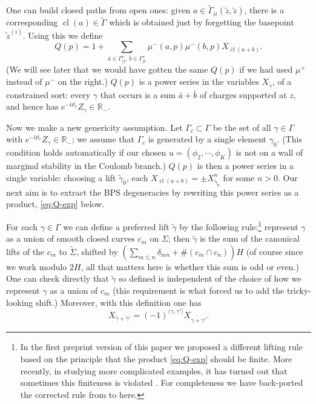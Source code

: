 \documentclass[11pt,a4paper]{article}
\def\R{{\mathbb{R}}}
\def\tz{{\tilde z}}
\newcommand\I{{\mathrm i}}
\newcommand{\inprod}[1]{\langle#1\rangle}
\DeclareMathOperator{\cl}{{cl}}
\begin{document}
One can build closed paths from open ones:  given $a \in \tilde \Gamma_{ii}(\tz,\tz)$,
there is a corresponding $\cl(a) \in \tilde \Gamma$ which is obtained just by forgetting the
basepoint $\tz^{(i)}$.
Using this we define
\begin{equation} \label{eq:def-Q}
Q(p) = 1 + \sum_{\bar a \in \Gamma_{ij}^s,\,\bar b \in \Gamma_{ji}^s} \mu^-(a,p) \mu^-(b,p) X_{\cl(a + b)}.
\end{equation}
(We will see later that we would have gotten the same $Q(p)$ if we had used
$\mu^+$ instead of $\mu^-$ on the right.)
$Q(p)$ is a power series in the variables $X_{\tilde\gamma}$, of a constrained sort: every
$\gamma$ that occurs is a sum $\bar a + \bar b$ of charges supported at $z$, and
hence has $e^{- \I \vartheta_c} Z_\gamma \in \R_-$.

Now we make a new genericity assumption.  Let $\Gamma_c \subset \Gamma$ be the set of all $\gamma \in \Gamma$
with $e^{- \I \vartheta_c} Z_\gamma \in \R_-$; we assume
that $\Gamma_c$ is generated by a single element $\gamma_0$.  (This condition holds automatically if our chosen
$u = (\phi_2, \cdots, \phi_K)$ is not on a wall of marginal stability in the
Coulomb branch.)  $Q(p)$ is then a power series in a single variable:
choosing a lift $\tilde\gamma_0$,
each $X_{\cl(a+b)} = \pm X_{\tilde \gamma_0}^n$
for some $n>0$.
Our next aim is to extract the BPS degeneracies by rewriting this power series as a product, \eqref{eq:Q-exp} below.

For each $\gamma \in \Gamma$ we can define a preferred lift $\tilde\gamma$ by the following rule:\footnote{In the first
preprint version of this paper we proposed a different lifting rule based on the principle that the product \eqref{eq:Q-exp}
should be finite.  More recently, in studying more complicated examples,
it has turned out that sometimes this finiteness is violated \cite{glmmn}.  For completeness
we have back-ported the corrected rule from \cite{glmmn} to here.}
represent $\gamma$ as a union of smooth closed curves $c_m$ on $\Sigma$; then $\tilde\gamma$ is the sum of
the canonical lifts of the $c_m$ to $\tilde\Sigma$, shifted by $\left( \sum_{m \le n} \delta_{mn} + \# (c_m \cap c_n) \right) H$
(of course since we work modulo $2H$, all that matters here is whether this sum is odd or even.)
One can check directly that $\tilde\gamma$ so defined is independent of the choice of how we represent $\gamma$
as a union of $c_m$ (this requirement is what forced us to add the tricky-looking shift.)
Moreover, with this definition one has
\begin{equation}
 X_{\tilde\gamma + \tilde\gamma'} = (-1)^{\inprod{\gamma, \gamma'}} X_{\widetilde{\gamma + \gamma'}}.
\end{equation}
\end{document}

